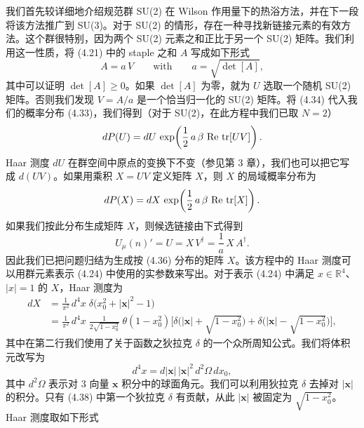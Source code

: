 我们首先较详细地介绍规范群 SU(2) 在 Wilson 作用量下的热浴方法，并在下一段将该方法推广到 SU(3)。对于 SU(2) 的情形，存在一种寻找新链接元素的有效方法。这个群很特别，因为两个 SU(2) 元素之和正比于另一个 SU(2) 矩阵。我们利用这一性质，将 (4.21) 中的 staple 之和 $A$ 写成如下形式
\begin{equation}
  A = a\,V \qquad \text{with}\qquad a = \sqrt{\det[A]},
\end{equation}
其中可以证明 $\det[A] \geq 0$。如果 $\det[A]$ 为零，就为 $U$ 选取一个随机 SU(2) 矩阵。否则我们发现 $V = A/a$ 是一个恰当归一化的 SU(2) 矩阵。将 (4.34) 代入我们的概率分布 (4.33)，我们得到（对于 SU(2)，在此方程中我们已取 $N = 2$）
\begin{equation}
  dP(U) = dU\,\exp\!\left(\frac{1}{2}\,a\,\beta\,\operatorname{Re}\,\operatorname{tr}[U V]\right).
\end{equation}
Haar 测度 $dU$ 在群空间中原点的变换下不变（参见第 3 章），我们也可以把它写成 $d(U V)$。如果用乘积 $X = U V$ 定义矩阵 $X$，则 $X$ 的局域概率分布为
\begin{equation}
  dP(X) = dX\,\exp\!\left(\frac{1}{2}\,a\,\beta\,\operatorname{Re}\,\operatorname{tr}[X]\right).
\end{equation}
如果我们按此分布生成矩阵 $X$，则候选链接由下式得到
\begin{equation}
  U_\mu(n)' = U = X\,V^\dagger = \frac{1}{a}\,X\,A^\dagger .
\end{equation}
因此我们已把问题归结为生成按 (4.36) 分布的矩阵 $X$。该方程中的 Haar 测度可以用群元素表示 (4.24) 中使用的实参数来写出。对于表示 (4.24) 中满足 $x \in \mathbb{R}^4$、$|x| = 1$ 的 $X$，Haar 测度为
\begin{equation}
  \begin{split}
    dX &= \frac{1}{\pi^2}\,d^4x\;\delta\!\big(x_0^2 + |\mathbf{x}|^2 - 1\big) \\
    &= \frac{1}{\pi^2}\,d^4x\;\frac{1}{2\sqrt{1-x_0^2}}\;\theta(1-x_0^2)
       \Big[\delta\!\Big(|\mathbf{x}| + \sqrt{1-x_0^2}\Big) + \delta\!\Big(|\mathbf{x}| - \sqrt{1-x_0^2}\Big)\Big],
  \end{split}
\end{equation}
其中在第二行我们使用了关于函数之狄拉克 $\delta$ 的一个众所周知公式。我们将体积元改写为
\begin{equation}
  d^4x = d|\mathbf{x}|\,|\mathbf{x}|^2\,d^2\Omega\,dx_0,
\end{equation}
其中 $d^2\Omega$ 表示对 3 向量 $\mathbf{x}$ 积分中的球面角元。我们可以利用狄拉克 $\delta$ 去掉对 $|\mathbf{x}|$ 的积分。只有 (4.38) 中第一个狄拉克 $\delta$ 有贡献，从此 $|\mathbf{x}|$ 被固定为 $\sqrt{1-x_0^2}$。Haar 测度取如下形式
